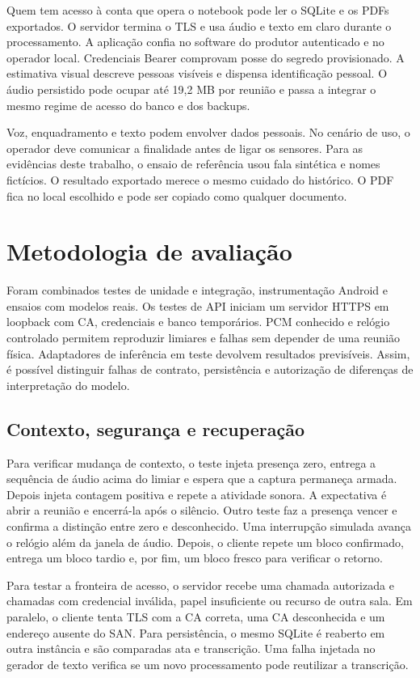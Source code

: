 \documentclass[12pt]{article}
\begin{document}
Quem tem acesso à conta que opera o notebook pode ler o SQLite e os PDFs exportados. O servidor termina o TLS e usa áudio e texto em claro durante o processamento. A aplicação confia no software do produtor autenticado e no operador local. Credenciais Bearer comprovam posse do segredo provisionado. A estimativa visual descreve pessoas visíveis e dispensa identificação pessoal. O áudio persistido pode ocupar até 19,2 MB por reunião e passa a integrar o mesmo regime de acesso do banco e dos backups.

Voz, enquadramento e texto podem envolver dados pessoais. No cenário de uso, o operador deve comunicar a finalidade antes de ligar os sensores. Para as evidências deste trabalho, o ensaio de referência usou fala sintética e nomes fictícios. O resultado exportado merece o mesmo cuidado do histórico. O PDF fica no local escolhido e pode ser copiado como qualquer documento.

\section{Metodologia de avaliação}

Foram combinados testes de unidade e integração, instrumentação Android e ensaios com modelos reais. Os testes de API iniciam um servidor HTTPS em loopback com CA, credenciais e banco temporários. PCM conhecido e relógio controlado permitem reproduzir limiares e falhas sem depender de uma reunião física. Adaptadores de inferência em teste devolvem resultados previsíveis. Assim, é possível distinguir falhas de contrato, persistência e autorização de diferenças de interpretação do modelo.

\subsection{Contexto, segurança e recuperação}

Para verificar mudança de contexto, o teste injeta presença zero, entrega a sequência de áudio acima do limiar e espera que a captura permaneça armada. Depois injeta contagem positiva e repete a atividade sonora. A expectativa é abrir a reunião e encerrá-la após o silêncio. Outro teste faz a presença vencer e confirma a distinção entre zero e desconhecido. Uma interrupção simulada avança o relógio além da janela de áudio. Depois, o cliente repete um bloco confirmado, entrega um bloco tardio e, por fim, um bloco fresco para verificar o retorno.

Para testar a fronteira de acesso, o servidor recebe uma chamada autorizada e chamadas com credencial inválida, papel insuficiente ou recurso de outra sala. Em paralelo, o cliente tenta TLS com a CA correta, uma CA desconhecida e um endereço ausente do SAN. Para persistência, o mesmo SQLite é reaberto em outra instância e são comparadas ata e transcrição. Uma falha injetada no gerador de texto verifica se um novo processamento pode reutilizar a transcrição.
\end{document}

